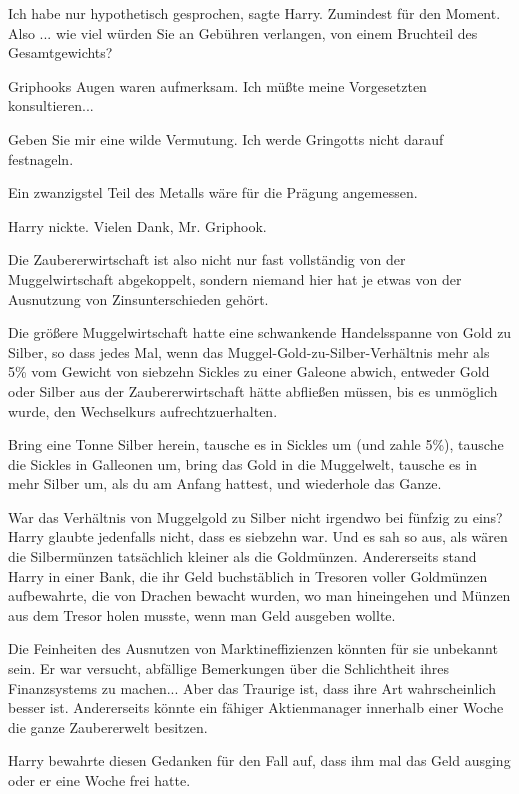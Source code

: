 \glqq{}Ich habe nur hypothetisch gesprochen\grqq{}, sagte Harry. Zumindest für
den Moment. \glqq{}Also ... wie viel würden Sie an Gebühren verlangen, von einem
Bruchteil des Gesamtgewichts?\grqq{}

Griphooks Augen waren aufmerksam. \glqq{}Ich müßte meine Vorgesetzten
konsultieren...\grqq{}

\glqq{}Geben Sie mir eine wilde Vermutung. Ich werde Gringotts nicht darauf
festnageln.\grqq{}

\glqq{}Ein zwanzigstel Teil des Metalls wäre für die Prägung angemessen.\grqq{}

Harry nickte. \glqq{}Vielen Dank, Mr. Griphook.\grqq{}

Die Zaubererwirtschaft ist also nicht nur fast vollständig von der
Muggelwirtschaft abgekoppelt, sondern niemand hier hat je etwas von der
Ausnutzung von Zinsunterschieden gehört.

Die größere Muggelwirtschaft hatte eine schwankende Handelsspanne von Gold zu
Silber, so dass jedes Mal, wenn das Muggel-Gold-zu-Silber-Verhältnis mehr als
5\% vom Gewicht von siebzehn Sickles zu einer Galeone abwich, entweder Gold oder
Silber aus der Zaubererwirtschaft hätte abfließen müssen, bis es unmöglich
wurde, den Wechselkurs aufrechtzuerhalten.

Bring eine Tonne Silber herein, tausche es in Sickles um (und zahle 5\%),
tausche die Sickles in Galleonen um, bring das Gold in die Muggelwelt, tausche
es in mehr Silber um, als du am Anfang hattest, und wiederhole das Ganze.

War das Verhältnis von Muggelgold zu Silber nicht irgendwo bei fünfzig zu eins?
Harry glaubte jedenfalls nicht, dass es siebzehn war. Und es sah so aus, als
wären die Silbermünzen tatsächlich kleiner als die Goldmünzen. Andererseits
stand Harry in einer Bank, die ihr Geld buchstäblich in Tresoren voller
Goldmünzen aufbewahrte, die von Drachen bewacht wurden, wo man hineingehen und
Münzen aus dem Tresor holen musste, wenn man Geld ausgeben wollte.

Die Feinheiten des Ausnutzen von Marktineffizienzen könnten für sie unbekannt
sein. Er war versucht, abfällige Bemerkungen über die Schlichtheit ihres
Finanzsystems zu machen... Aber das Traurige ist, dass ihre Art wahrscheinlich
besser ist. Andererseits könnte ein fähiger Aktienmanager innerhalb einer Woche
die ganze Zaubererwelt besitzen.

Harry bewahrte diesen Gedanken für den Fall auf, dass ihm mal das Geld ausging
oder er eine Woche frei hatte.

